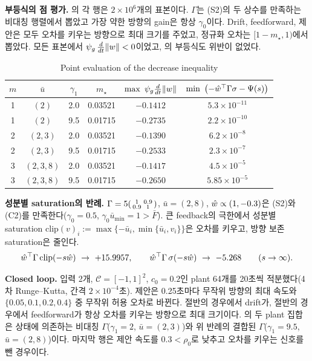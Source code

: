 \documentclass[11pt]{article}\usepackage[margin=1in]{geometry}\usepackage{amsmath,amssymb,amsthm,mathtools}\usepackage{graphicx}\graphicspath{{figures/}{../figures/}{figs/}{./}}\usepackage{enumitem}\usepackage{hyperref}\usepackage{cleveref}\usepackage{tikz}\usetikzlibrary{arrows.meta,positioning,calc,shapes.geometric}\usepackage{float}\usepackage[most]{tcolorbox}\usepackage{kotex}\usepackage{booktabs}\emergencystretch=1.6em\tolerance=2000 \crefname{assumption}{Assumption}{Assumptions}\Crefname{assumption}{Assumption}{Assumptions}\crefname{definition}{Definition}{Definitions}\Crefname{definition}{Definition}{Definitions}\crefname{proposition}{Proposition}{Propositions}\Crefname{proposition}{Proposition}{Propositions}\crefname{fact}{Fact}{Facts}\Crefname{fact}{Fact}{Facts} \newtheorem{assumption}{Assumption}\newtheorem{definition}{Definition}\newtheorem{lemma}{Lemma}\newtheorem{proposition}{Proposition}\newtheorem{theorem}{Theorem}\newtheorem{corollary}{Corollary}\newtheorem{fact}{Fact}\theoremstyle{remark}\newtheorem{remark}{Remark} \newcommand{\R}{\mathbb{R}}\newcommand{\U}{\mathcal U}
\newcommand{\Cset}{\mathcal C}\newcommand{\Pcl}{\mathcal P}\newcommand{\Zset}{\mathcal Z_0}\newcommand{\Xset}{\mathcal X_0}
\begin{document}
\textbf{부등식의 점 평가.} 의 각 행은 $2\times10^6$개의 표본이다. $\Gamma$는 (S2)의 두 상수를 만족하는 비대칭 행렬에서 뽑았고 가장 약한 방향의 gain은 항상 $\gamma_0$이다. Drift, feedforward, 제안은 모두 오차를 키우는 방향으로 최대 크기를 주었고, 정규화 오차는 $[1-m_\star,1)$에서 뽑았다. 모든 표본에서 $\psi_g\,\tfrac{d}{dt}\lVert w\rVert<0$이었고, 의 부등식도 위반이 없었다.

\begin{table}[H]
\centering\footnotesize
\caption{Point evaluation of the decrease inequality}
\label{tab:point}
\begin{tabular}{cccccc}
\toprule
$m$ & $\bar u$ & $\gamma_1$ & $m_\star$ & $\max\ \psi_g\frac{d}{dt}\norm{w}$ & $\min\ \big({-\what^\top\Gamma\sigma}-\Psi(s)\big)$ \\
\midrule
1 & $(2)$ & 2.0 & 0.03521 & $-0.1412$ & $5.3\times10^{-11}$ \\
1 & $(2)$ & 9.5 & 0.01715 & $-0.2735$ & $2.2\times10^{-10}$ \\
2 & $(2,3)$ & 2.0 & 0.03521 & $-0.1390$ & $6.2\times10^{-8}$ \\
2 & $(2,3)$ & 9.5 & 0.01715 & $-0.2533$ & $2.3\times10^{-7}$ \\
3 & $(2,3,8)$ & 2.0 & 0.03521 & $-0.1417$ & $4.5\times10^{-5}$ \\
3 & $(2,3,8)$ & 9.5 & 0.01715 & $-0.2650$ & $5.85\times10^{-5}$ \\
\bottomrule
\end{tabular}
\end{table}

\textbf{성분별 saturation의 반례.} $\Gamma=5\begin{psmallmatrix}1&0.9\\0.9&1\end{psmallmatrix}$, $\bar u=(2,8)$, $\hat w\propto(1,-0.3)$은 (S2)와 (C2)를 만족한다($\gamma_0=0.5$, $\gamma_0\bar u_{\min}=1>\bar F$). 큰 feedback의 극한에서 성분별 saturation $\mathrm{clip}(v)_i:=\max\{-\bar u_i,\min\{\bar u_i,v_i\}\}$은 오차를 키우고, 방향 보존 saturation은 줄인다.
\[
\what^\top\Gamma\,\mathrm{clip}(-s\what)\ \to\ +15.9957,\qquad \what^\top\Gamma\,\sigma(-s\what)\ \to\ -5.268\qquad(s\to\infty).
\]

\textbf{Closed loop.} 입력 2개, $\Cset=[-1,1]^2$, $c_0=0.2$인 plant 64개를 20초씩 적분했다(4차 Runge--Kutta, 간격 $2\times10^{-4}$초). 제안은 0.25초마다 무작위 방향의 최대 속도와 $\{0.05,0.1,0.2,0.4\}$ 중 무작위 허용 오차로 바뀐다. 절반의 경우에서 drift가, 절반의 경우에서 feedforward가 항상 오차를 키우는 방향으로 최대 크기이다. 의 두 plant 집합은 상태에 의존하는 비대칭 $\Gamma$($\gamma_1=2$, $\bar u=(2,3)$)와 위 반례의 결합된 $\Gamma$($\gamma_1=9.5$, $\bar u=(2,8)$)이다. 마지막 행은 제안 속도를 $0.3<\rho_0$로 낮추고 오차를 키우는 신호를 뺀 경우이다.
\end{document}
